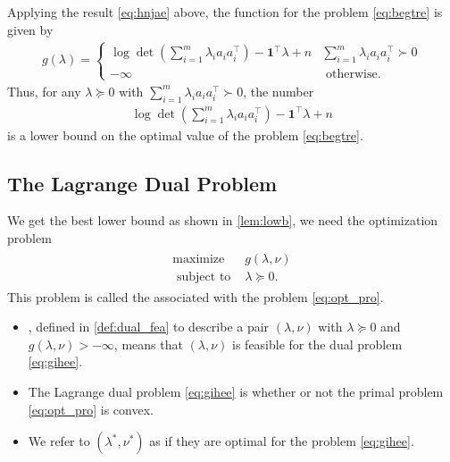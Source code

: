 \documentclass{article}
\begin{document}
Applying the result \cref{eq:hnjae} above, the   function for the problem \cref{eq:begtre} is given by
\begin{align*}
g(\lambda)= \begin{cases}\log \operatorname{det}\left(\sum_{i=1}^{m} \lambda_{i} a_{i} a_{i}^{\top}\right)-\mathbf{1}^{\top} \lambda+n & \sum_{i=1}^{m} \lambda_{i} a_{i} a_{i}^{\top} \succ 0 \\ -\infty & \text { otherwise. }\end{cases}
\end{align*}
Thus, for any $\lambda \succeq 0$ with $\sum_{i=1}^{m} \lambda_{i} a_{i} a_{i}^{\top} \succ 0$, the number
\begin{align*}
\log \operatorname{det}\left(\sum_{i=1}^{m} \lambda_{i} a_{i} a_{i}^{\top}\right)-\mathbf{1}^{\top} \lambda+n
\end{align*}
is a lower bound on the optimal value of the problem \cref{eq:begtre}.
\subsection{The Lagrange Dual Problem}
We get the best lower bound as shown in \cref{lem:lowb}, we  need the  optimization problem
\begin{align}
\begin{array}{ll}
\operatorname{maximize} & g(\lambda, \nu) \\
\text { subject to } & \lambda \succeq 0 .
\end{array}\label{eq:gihee}
\end{align}
This problem is called the  associated with the problem \cref{eq:opt_pro}. 
\begin{itemize}
    \item {}, defined in \cref{def:dual_fea} to describe a pair $(\lambda, \nu)$ with $\lambda \succeq 0$ and $g(\lambda, \nu)>-\infty$, means that $(\lambda, \nu)$ is feasible for the dual problem \cref{eq:gihee}.
    \item The Lagrange dual problem \cref{eq:gihee} is  whether or not the primal problem \cref{eq:opt_pro} is convex.
    \item We refer to $\left(\lambda^* , \nu^* \right)$ as  if they are optimal for the problem \cref{eq:gihee}.
\end{itemize}
\end{document}
